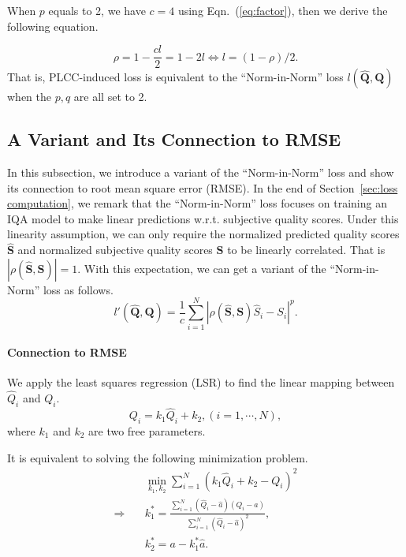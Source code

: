 \documentclass[sigconf]{acmart}
\begin{document}
When $p$ equals to 2, we have $c=4$ using Eqn.~(\ref{eq:factor}), then we derive the following equation.

\begin{equation}\label{eq:relationship1}
    \rho = 1 - \frac{cl}{2}=1-2l\Longleftrightarrow l = (1-\rho)/2. 
\end{equation}
That is, PLCC-induced loss is equivalent to the ``Norm-in-Norm'' loss $l(\hat{\mathbf{Q}}, \mathbf{Q})$ when the $p, q$ are all set to 2.

\subsection{A Variant and Its Connection to RMSE}
In this subsection, we introduce a variant of the ``Norm-in-Norm'' loss and show its connection to root mean square error (RMSE).
In the end of Section~\ref{sec:loss computation}, we remark that the ``Norm-in-Norm'' loss focuses on training an IQA model to make linear predictions w.r.t. subjective quality scores.
Under this linearity assumption, we can only require the normalized predicted quality scores $\hat{\mathbf{S}}$ and normalized subjective quality scores ${\mathbf{S}}$ to be linearly correlated. 
That is $|\rho(\hat{\mathbf{S}}, {\mathbf{S}})|=1$. 
With this expectation, we can get a variant of the ``Norm-in-Norm'' loss as follows.
\begin{equation}
    l'(\hat{\mathbf{Q}}, \mathbf{Q}) = \frac{1}{c}\sum_{i=1}^{N} {|\rho(\hat{\mathbf{S}}, {\mathbf{S}})\hat{S}_{i}-{S}_{i}|}^{p}.
\end{equation}

\paragraph{Connection to RMSE} 
We apply the least squares regression (LSR) to find the linear mapping between $\hat{Q}_i$ and ${Q}_i$.
\begin{equation}
    Q_i = k_1\hat{Q}_i+k_2, (i=1,\cdots, N),
\end{equation}
where $k_1$ and $k_2$ are two free parameters. 

It is equivalent to solving the following minimization problem.
\begin{align}
     &\min_{k_1,k_2}\sum_{i=1}^N(k_1\hat{Q}_i+k_2-Q_i)^2 \label{eq:LSR} \\
    \Longrightarrow\quad& k_1^*=\frac{\sum_{i=1}^N(\hat{Q}_{i}-\hat{a})(Q_{i}-a)}{\sum_{i=1}^N{(\hat{Q}_{i}-\hat{a})}^2}, \nonumber\\
    & k_2^*=a-k_1^*\hat{a}. \nonumber
\end{align}
\end{document}
